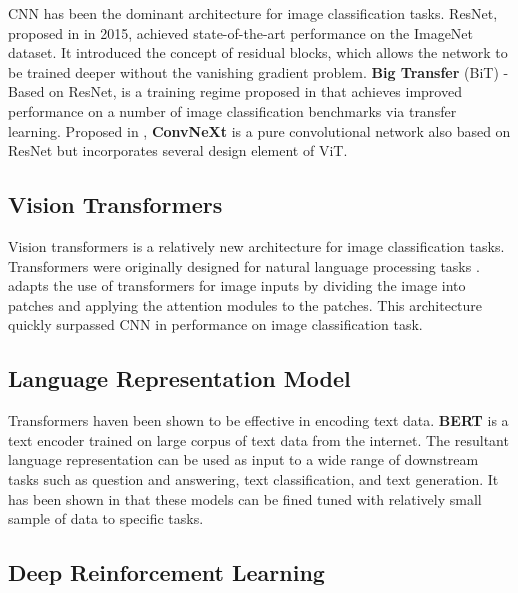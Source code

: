 \documentclass[conference]{IEEEtran}
\begin{document}
CNN has been the dominant architecture for image classification tasks. ResNet, proposed in \cite{heDeepResidualLearning2015} in 2015, achieved state-of-the-art performance on the ImageNet dataset. It introduced the concept of residual blocks, which allows the network to be trained deeper without the vanishing gradient problem. \textbf{Big Transfer} (BiT) - Based on ResNet\cite{heDeepResidualLearning2015}, is a training regime proposed in \cite{kolesnikovBigTransferBiT2020} that achieves improved performance on a number of image classification benchmarks via transfer learning. Proposed in \cite{liuConvNet2020s2022}, \textbf{ConvNeXt} is a pure convolutional network also based on ResNet but incorporates several design element of ViT.

\subsection{Vision Transformers}

Vision transformers is a relatively new architecture for image classification tasks. Transformers were originally designed for natural language processing tasks \cite{vaswaniAttentionAllYou2023}. \cite{dosovitskiyImageWorth16x162021} adapts the use of transformers for image inputs by dividing the image into patches and applying the attention modules to the patches. This architecture quickly surpassed CNN in performance on image classification task\cite{PapersCodeImageNet}.

\subsection{Language Representation Model}

Transformers \cite{vaswaniAttentionAllYou2023} haven been shown to be effective in encoding text data. \textbf{BERT} \cite{devlinBERTPretrainingDeep2019} is a text encoder trained on large corpus of text data from the internet. The resultant language representation can be used as input to a wide range of downstream tasks such as question and answering, text classification, and text generation. It has been shown in \cite{brownLanguageModelsAre2020} that these models can be fined tuned with relatively small sample of data to specific tasks.

\subsection{Deep Reinforcement Learning}
\end{document}
